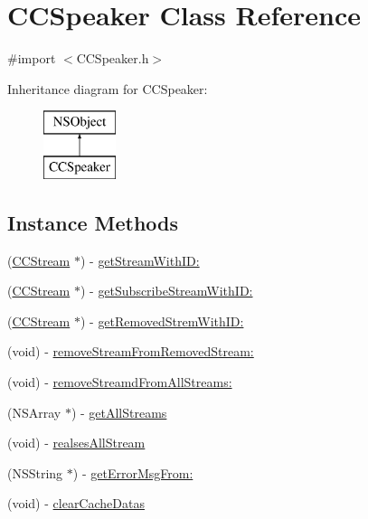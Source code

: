 \hypertarget{interface_c_c_speaker}{}\section{C\+C\+Speaker Class Reference}
\label{interface_c_c_speaker}


{\ttfamily \#import $<$C\+C\+Speaker.\+h$>$}

Inheritance diagram for C\+C\+Speaker\+:\begin{figure}[H]
\begin{center}
\leavevmode
\includegraphics[height=2.000000cm]{interface_c_c_speaker}
\end{center}
\end{figure}
\subsection*{Instance Methods}
\begin{DoxyCompactItemize}
\item 
(\hyperlink{interface_c_c_stream}{C\+C\+Stream} $\ast$) -\/ \hyperlink{interface_c_c_speaker_afaaf11a11080fff3ce0157ba4ab2d904}{get\+Stream\+With\+I\+D\+:}
\item 
(\hyperlink{interface_c_c_stream}{C\+C\+Stream} $\ast$) -\/ \hyperlink{interface_c_c_speaker_a612d3ca702b8e8f8dcd94c285cdcd807}{get\+Subscribe\+Stream\+With\+I\+D\+:}
\item 
(\hyperlink{interface_c_c_stream}{C\+C\+Stream} $\ast$) -\/ \hyperlink{interface_c_c_speaker_abae7fec416e47da8468342b66a587da9}{get\+Removed\+Strem\+With\+I\+D\+:}
\item 
(void) -\/ \hyperlink{interface_c_c_speaker_a6d2ff7ef65cf4bb27aaea04abdcea892}{remove\+Stream\+From\+Removed\+Stream\+:}
\item 
(void) -\/ \hyperlink{interface_c_c_speaker_a0ca8c1d569368f57990783e0fc8f4c4f}{remove\+Streamd\+From\+All\+Streams\+:}
\item 
(N\+S\+Array $\ast$) -\/ \hyperlink{interface_c_c_speaker_a1cd2a8633022985f13382a6895f96f21}{get\+All\+Streams}
\item 
(void) -\/ \hyperlink{interface_c_c_speaker_a6753ddeafdb6b5454b96f19bc820dc4b}{realses\+All\+Stream}
\item 
(N\+S\+String $\ast$) -\/ \hyperlink{interface_c_c_speaker_a89a3d868010262874a4bb26e349655fb}{get\+Error\+Msg\+From\+:}
\item 
(void) -\/ \hyperlink{interface_c_c_speaker_a2cc42a5a8fed6f90cf193eac7cad306a}{clear\+Cache\+Datas}
\end{DoxyCompactItemize}
